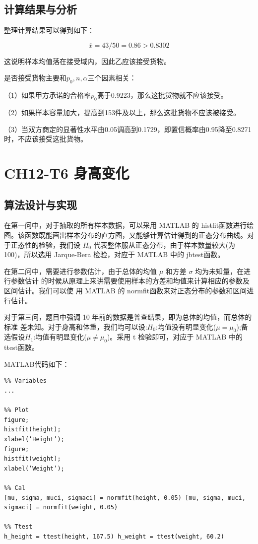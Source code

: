 \documentclass{article}
\begin{document}
\subsection{计算结果与分析}

整理计算结果可以得到如下：

$$\overline x = 43/50 = 0.86 > 0.8302$$

这说明样本均值落在接受域内，因此乙应该接受货物。

是否接受货物主要和$p_0,n,\alpha$三个因素相关：

（1）如果甲方承诺的合格率$p_0$高于0.9223，那么这批货物就不应该接受。

（2）如果样本容量加大，提高到153件及以上，那么这批货物不应该被接受。

（3）当双方商定的显著性水平由0.05调高到0.1729，即置信概率由0.95降至0.8271时，不应该接受这批货物。



\section{CH12-T6 身高变化}

\subsection{算法设计与实现}

在第一问中，对于抽取的所有样本数据，可以采用 MATLAB 的 histfit函数进行绘图。该函数既能画出样本分布的直方图，又能够计算估计得到的正态分布曲线。对于正态性的检验，我们设 $H_0$ 代表整体服从正态分布，由于样本数量较大(为 100)，所以选用 Jarque-Bera 检验，对应于 MATLAB 中的 jbtest函数。


在第二问中，需要进行参数估计，由于总体的均值 $\mu$ 和方差 $\sigma$ 均为未知量，在进行参数估计 的时候从原理上来讲需要使用样本的方差和均值来计算相应的参数及区间估计。我们可以使 用 MATLAB 的 normfit函数来对正态分布的参数和区间进行估计。


对于第三问，题目中强调 10 年前的数据是普查结果，即为总体的均值，而总体的标准 差未知。对于身高和体重，我们均可以设:$H_0$:均值没有明显变化($\mu = \mu_0$);备选假设$H_1$:均值有明显变化($\mu \neq \mu_0$)。采用 t 检验即可，对应于 MATLAB 中的 ttest函数。


MATLAB代码如下：

\begin{lstlisting}
%% Variables
...

%% Plot
figure;
histfit(height);
xlabel(’Height’);
figure;
histfit(weight);
xlabel(’Weight’);

%% Cal
[mu, sigma, muci, sigmaci] = normfit(height, 0.05) [mu, sigma, muci, sigmaci] = normfit(weight, 0.05)

%% Ttest
h_height = ttest(height, 167.5) h_weight = ttest(weight, 60.2)

\end{lstlisting}
\end{document}
